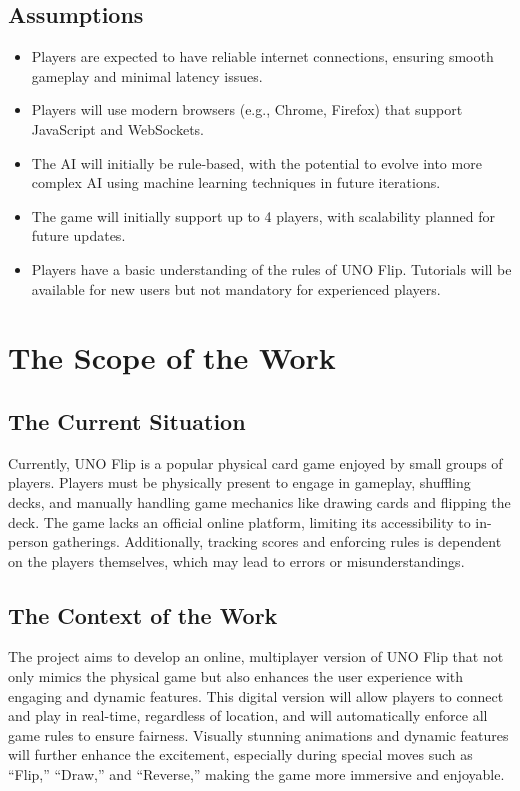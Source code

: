 \documentclass{article}
\begin{document}
\subsection{Assumptions}
\begin{itemize}
    \item Players are expected to have reliable internet connections, ensuring smooth gameplay and minimal latency issues.
    \item Players will use modern browsers (e.g., Chrome, Firefox) that support JavaScript and WebSockets.
    \item The AI will initially be rule-based, with the potential to evolve into more complex AI using machine learning techniques in future iterations.
    \item The game will initially support up to 4 players, with scalability planned for future updates.
    \item Players have a basic understanding of the rules of UNO Flip. Tutorials will be available for new users but not mandatory for experienced players.
\end{itemize}

\section{The Scope of the Work}

\subsection{The Current Situation}
Currently, UNO Flip is a popular physical card game enjoyed by small groups of players. Players must be physically present to engage in gameplay, shuffling decks, and manually handling game mechanics like drawing cards and flipping the deck. The game lacks an official online platform, limiting its accessibility to in-person gatherings. Additionally, tracking scores and enforcing rules is dependent on the players themselves, which may lead to errors or misunderstandings.

\subsection{The Context of the Work}
The project aims to develop an online, multiplayer version of UNO Flip that not only mimics the physical game but also enhances the user experience with engaging and dynamic features. This digital version will allow players to connect and play in real-time, regardless of location, and will automatically enforce all game rules to ensure fairness. Visually stunning animations and dynamic features will further enhance the excitement, especially during special moves such as “Flip,” “Draw,” and “Reverse,” making the game more immersive and enjoyable.
\end{document}
